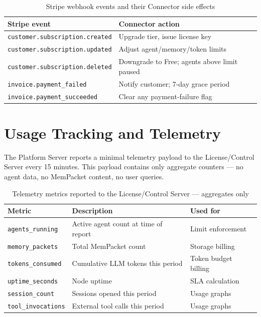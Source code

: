 \begin{table}[H]
\centering
\renewcommand{\arraystretch}{1.4}
\begin{tabularx}{\textwidth}{@{}lX@{}}
\toprule
\textbf{Stripe event} & \textbf{Connector action} \\
\midrule
\texttt{customer.subscription.created}  & Upgrade tier, issue license key \\
\texttt{customer.subscription.updated}  & Adjust agent/memory/token limits \\
\texttt{customer.subscription.deleted}  & Downgrade to Free; agents above limit paused \\
\texttt{invoice.payment\_failed}        & Notify customer; 7-day grace period \\
\texttt{invoice.payment\_succeeded}     & Clear any payment-failure flag \\
\bottomrule
\end{tabularx}
\caption{Stripe webhook events and their Connector side effects}
\end{table}

\section{Usage Tracking and Telemetry}

The Platform Server reports a minimal telemetry payload to the
License/Control Server every 15 minutes. This payload contains only
aggregate counters — no agent data, no MemPacket content, no user queries.

\begin{table}[H]
\centering
\renewcommand{\arraystretch}{1.4}
\begin{tabularx}{\textwidth}{@{}lXl@{}}
\toprule
\textbf{Metric} & \textbf{Description} & \textbf{Used for} \\
\midrule
\texttt{agents\_running}     & Active agent count at time of report & Limit enforcement \\
\texttt{memory\_packets}     & Total MemPacket count                & Storage billing \\
\texttt{tokens\_consumed}    & Cumulative LLM tokens this period    & Token budget billing \\
\texttt{uptime\_seconds}     & Node uptime                          & SLA calculation \\
\texttt{session\_count}      & Sessions opened this period          & Usage graphs \\
\texttt{tool\_invocations}   & External tool calls this period      & Usage graphs \\
\bottomrule
\end{tabularx}
\caption{Telemetry metrics reported to the License/Control Server — aggregates only}
\end{table}

